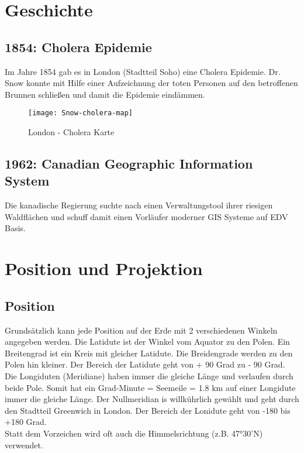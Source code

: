 \documentclass[11pt,fleqn]{book} %
\begin{document}
\chapter{Geschichte}

\section{1854: Cholera Epidemie}
Im Jahre 1854 gab es in London (Stadtteil Soho) eine Cholera Epidemie. Dr. Snow konnte mit Hilfe einer Aufzeichnung der toten Personen auf den betroffenen Brunnen schlie{\ss}en und damit die Epidemie eind\"ammen.

\begin{figure}[h]
\centering\texttt{[image: Snow-cholera-map]}
\caption{London - Cholera Karte}
\end{figure}

\section{1962: Canadian Geographic Information System}
Die kanadische Regierung suchte nach einen Verwaltungstool ihrer riesigen Waldfl\"achen und schuff damit einen Vorl\"aufer moderner GIS Systeme auf EDV Basis. 



\chapter{Position und Projektion}

\section{Position}
Grunds\"atzlich kann jede Position auf der Erde mit 2 verschiedenen Winkeln angegeben werden. Die Latidute ist der Winkel vom Aquator zu den Polen. 
Ein Breitengrad ist ein Kreis mit gleicher Latidute. Die Breidengrade werden zu den Polen hin kleiner. Der Bereich der Latidute geht von + 90 Grad zu - 90 Grad. \\
Die Longiduten (Meridiane) haben immer die gleiche L\"ange und verlaufen durch beide Pole. Somit hat ein Grad-Minute  = Seemeile = 1.8 km auf einer Longidute immer die gleiche L\"ange. Der Nullmeridian is willk\"uhrlich gew\"ahlt und geht durch den Stadtteil Greenwich in London. Der Bereich der Lonidute geht von -180 bis +180 Grad. \\
Statt dem Vorzeichen wird oft auch die Himmelsrichtung (z.B. 47°30'N) verwendet.   
 
\end{document}
